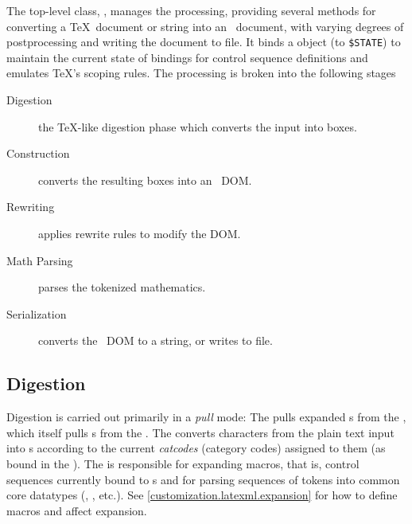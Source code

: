 \documentclass{book}
\newcommand{\ltxcode}{\lstinline[style=latexml]}
\begin{document}
The top-level class, , manages the processing, providing several methods
for converting a \TeX\ document or string into an \XML\ document, with varying degrees
of postprocessing and writing the document to file.
It binds a  object (to \ltxcode|$STATE|) to maintain the current state
of bindings for control sequence definitions and emulates \TeX's scoping rules.
The processing is broken into the following stages
\begin{description}
   \item[Digestion] the \TeX-like digestion phase which converts the input into boxes.
   \item[Construction] converts the resulting boxes into an \XML\ DOM.
   \item[Rewriting] applies rewrite rules to modify the DOM.
   \item[Math Parsing] parses the tokenized mathematics.
   \item[Serialization] converts the \XML\ DOM to a string, or writes to file.
\end{description}

\subsection{Digestion}\label{architecture.digestion}
%
%
%
%
%
%
%
%
%
%
%

Digestion is carried out primarily in a \emph{pull} mode: The 
pulls expanded s from the , which itself pulls s from 
the .  The  converts characters from the plain text input
into s according to the current \emph{catcodes} (category codes) assigned to
them (as bound in the ).  
The  is responsible for expanding macros,
that is, control sequences currently bound to s
and for parsing sequences of tokens into common core datatypes
(, , etc.).
See \ref{customization.latexml.expansion} for how to define macros
and affect expansion.
\end{document}
